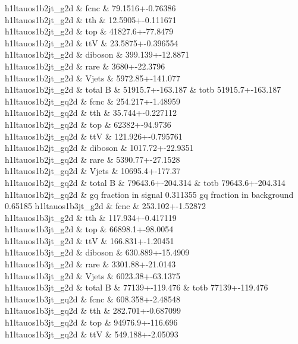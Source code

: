 h1ltauos1b2jt_g2d \& fcnc \& 79.1516+-0.76386 \\
h1ltauos1b2jt_g2d \& tth \& 12.5905+-0.111671 \\
h1ltauos1b2jt_g2d \& top \& 41827.6+-77.8479 \\
h1ltauos1b2jt_g2d \& ttV \& 23.5875+-0.396554 \\
h1ltauos1b2jt_g2d \& diboson \& 399.139+-12.8871 \\
h1ltauos1b2jt_g2d \& rare \& 3680+-22.3796 \\
h1ltauos1b2jt_g2d \& Vjets \& 5972.85+-141.077 \\
h1ltauos1b2jt_g2d \&  total B  \& 51915.7+-163.187 \&  totb 51915.7+-163.187 \\
h1ltauos1b2jt_gq2d \& fcnc \& 254.217+-1.48959 \\
h1ltauos1b2jt_gq2d \& tth \& 35.744+-0.227112 \\
h1ltauos1b2jt_gq2d \& top \& 62382+-94.9736 \\
h1ltauos1b2jt_gq2d \& ttV \& 121.926+-0.795761 \\
h1ltauos1b2jt_gq2d \& diboson \& 1017.72+-22.9351 \\
h1ltauos1b2jt_gq2d \& rare \& 5390.77+-27.1528 \\
h1ltauos1b2jt_gq2d \& Vjets \& 10695.4+-177.37 \\
h1ltauos1b2jt_gq2d \&  total B  \& 79643.6+-204.314 \&  totb 79643.6+-204.314 \\
h1ltauos1b2jt_gq2d \&  gq fraction in signal 0.311355 gq fraction in background 0.65185
h1ltauos1b3jt_g2d \& fcnc \& 253.102+-1.52872 \\
h1ltauos1b3jt_g2d \& tth \& 117.934+-0.417119 \\
h1ltauos1b3jt_g2d \& top \& 66898.1+-98.0054 \\
h1ltauos1b3jt_g2d \& ttV \& 166.831+-1.20451 \\
h1ltauos1b3jt_g2d \& diboson \& 630.889+-15.4909 \\
h1ltauos1b3jt_g2d \& rare \& 3301.88+-21.0143 \\
h1ltauos1b3jt_g2d \& Vjets \& 6023.38+-63.1375 \\
h1ltauos1b3jt_g2d \&  total B  \& 77139+-119.476 \&  totb 77139+-119.476 \\
h1ltauos1b3jt_gq2d \& fcnc \& 608.358+-2.48548 \\
h1ltauos1b3jt_gq2d \& tth \& 282.701+-0.687099 \\
h1ltauos1b3jt_gq2d \& top \& 94976.9+-116.696 \\
h1ltauos1b3jt_gq2d \& ttV \& 549.188+-2.05093 \\
